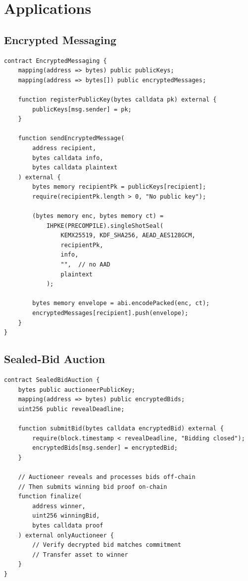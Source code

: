 \documentclass[11pt,a4paper]{article}
\theoremstyle{definition}
\begin{document}
\section{Applications}

\subsection{Encrypted Messaging}

\begin{lstlisting}[language=Solidity]
contract EncryptedMessaging {
    mapping(address => bytes) public publicKeys;
    mapping(address => bytes[]) public encryptedMessages;

    function registerPublicKey(bytes calldata pk) external {
        publicKeys[msg.sender] = pk;
    }

    function sendEncryptedMessage(
        address recipient,
        bytes calldata info,
        bytes calldata plaintext
    ) external {
        bytes memory recipientPk = publicKeys[recipient];
        require(recipientPk.length > 0, "No public key");

        (bytes memory enc, bytes memory ct) =
            IHPKE(PRECOMPILE).singleShotSeal(
                KEMX25519, KDF_SHA256, AEAD_AES128GCM,
                recipientPk,
                info,
                "",  // no AAD
                plaintext
            );

        bytes memory envelope = abi.encodePacked(enc, ct);
        encryptedMessages[recipient].push(envelope);
    }
}
\end{lstlisting}

\subsection{Sealed-Bid Auction}

\begin{lstlisting}[language=Solidity]
contract SealedBidAuction {
    bytes public auctioneerPublicKey;
    mapping(address => bytes) public encryptedBids;
    uint256 public revealDeadline;

    function submitBid(bytes calldata encryptedBid) external {
        require(block.timestamp < revealDeadline, "Bidding closed");
        encryptedBids[msg.sender] = encryptedBid;
    }

    // Auctioneer reveals and processes bids off-chain
    // Then submits winning bid proof on-chain
    function finalize(
        address winner,
        uint256 winningBid,
        bytes calldata proof
    ) external onlyAuctioneer {
        // Verify decrypted bid matches commitment
        // Transfer asset to winner
    }
}
\end{lstlisting}
\end{document}
